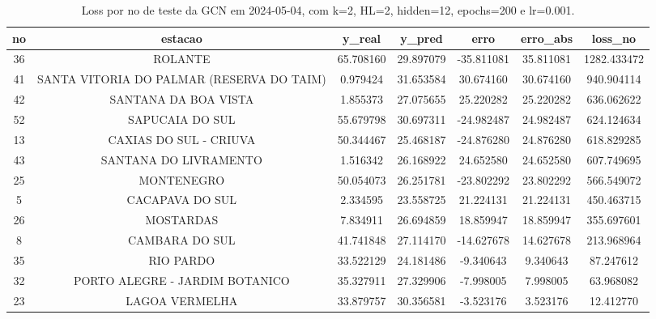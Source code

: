 \begin{table}[h]
\centering
\caption{Loss por no de teste da GCN em 2024-05-04, com k=2, HL=2, hidden=12, epochs=200 e lr=0.001.}
\label{tab:gcn_loss_k2_hl2_h12_e200_d20240504}
\begin{tabular}{ccccccc}
\toprule
no & estacao & y\_real & y\_pred & erro & erro\_abs & loss\_no \\
\midrule
36 & ROLANTE & 65.708160 & 29.897079 & -35.811081 & 35.811081 & 1282.433472 \\
41 & SANTA VITORIA DO PALMAR (RESERVA DO TAIM) & 0.979424 & 31.653584 & 30.674160 & 30.674160 & 940.904114 \\
42 & SANTANA DA BOA VISTA & 1.855373 & 27.075655 & 25.220282 & 25.220282 & 636.062622 \\
52 & SAPUCAIA DO SUL & 55.679798 & 30.697311 & -24.982487 & 24.982487 & 624.124634 \\
13 & CAXIAS DO SUL - CRIUVA & 50.344467 & 25.468187 & -24.876280 & 24.876280 & 618.829285 \\
43 & SANTANA DO LIVRAMENTO & 1.516342 & 26.168922 & 24.652580 & 24.652580 & 607.749695 \\
25 & MONTENEGRO & 50.054073 & 26.251781 & -23.802292 & 23.802292 & 566.549072 \\
5 & CACAPAVA DO SUL & 2.334595 & 23.558725 & 21.224131 & 21.224131 & 450.463715 \\
26 & MOSTARDAS & 7.834911 & 26.694859 & 18.859947 & 18.859947 & 355.697601 \\
8 & CAMBARA DO SUL & 41.741848 & 27.114170 & -14.627678 & 14.627678 & 213.968964 \\
35 & RIO PARDO & 33.522129 & 24.181486 & -9.340643 & 9.340643 & 87.247612 \\
32 & PORTO ALEGRE - JARDIM BOTANICO & 35.327911 & 27.329906 & -7.998005 & 7.998005 & 63.968082 \\
23 & LAGOA VERMELHA & 33.879757 & 30.356581 & -3.523176 & 3.523176 & 12.412770 \\
\bottomrule
\end{tabular}
\end{table}
